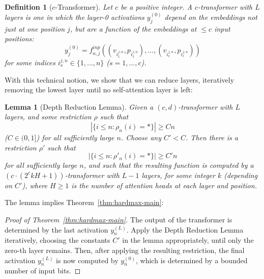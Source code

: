 \documentclass[11pt,a4paper]{article}
\newcounter{theorem}
\newtheorem{defin}[theorem]{Definition}
\newtheorem{lemma}[theorem]{Lemma}
\begin{document}
\begin{defin}[$c$-Transformer]
Let $c$ be a positive integer. A $c$-transformer with $L$ layers is one in which the layer-0 activations $y_j^{(0)}$ depend on the embeddings not just at one position $j$, but are a function of the embeddings at $\leq c$ input positions:
\begin{equation}
    y_j^{(0)} = f^{inp}_{n,j}((v_{i_1^{j,n}}, p_{i_1^{j,n}}), \dots, (v_{i_c^{j,n}}, p_{i_c^{j,n}} ))
\end{equation}
for some indices ${i_s^{j,n}} \in \{1, \dots, n\}$ ($s = 1, \dots, c$).
\end{defin}


With this technical notion, we show that we can reduce layers, iteratively removing the lowest layer until no self-attention layer is left:

\begin{lemma}[Depth Reduction Lemma]\label{lemma:depth-red}
Given a $(c,d)$-transformer with $L$ layers, and some restriction $\rho$ such that
\begin{equation}
|\{i \leq n: \rho_n(i) = *\}| \geq Cn
\end{equation}
($C \in (0,1]$)
for all sufficiently large $n$.
Choose any $C' < C$.
Then there is a restriction $\rho'$ 
such that
\begin{equation}
|\{i \leq n: \rho'_n(i) = *\}| \geq C'n
\end{equation}
for all sufficiently large $n$, 
and such that the resulting function is computed by a $( c\cdot(2^ckH+1))$-transformer with $L-1$ layers, for some integer $k$ (depending on $C'$), where $H \geq 1$ is the number of attention heads at each layer and position.
\end{lemma}
The lemma implies Theorem~\ref{thm:hardmax-main}:
\begin{proof}[Proof of Theorem~\ref{thm:hardmax-main}]
The output of the transformer is determined by the last activation $y_{n}^{(L)}$.
Apply the Depth Reduction Lemma iteratively, choosing the constants $C'$ in the lemma appropriately, until only the zero-th layer remains.
Then, after applying the resulting restriction, the final activation $y_{n}^{(L)}$ is now computed by $y_{n}^{(0)}$, which is determined by a bounded number of input bits.
\end{proof}
\end{document}
